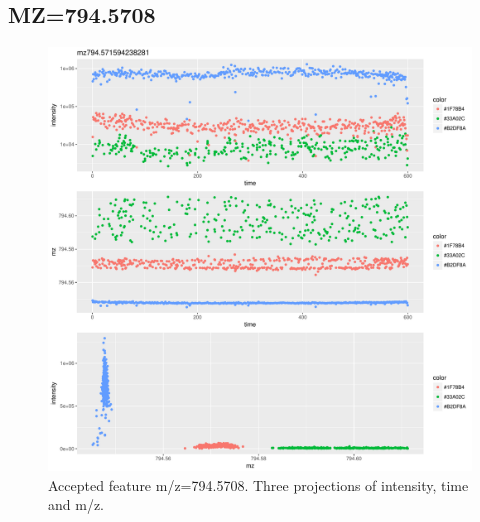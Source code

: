 \documentclass[]{article}
\begin{document}
\subsection{MZ=794.5708}\label{mz794.5708}

\begin{figure}[H]
\begin{center}
\includegraphics{Supplementary_document_files/figure-latex/cluster.mz.794-1.pdf}
\caption{Accepted feature m/z=794.5708. Three projections of intensity, time and m/z.}
\label{fig:d3.mz.794.5708}
\end{center}
\end{figure}
\end{document}
